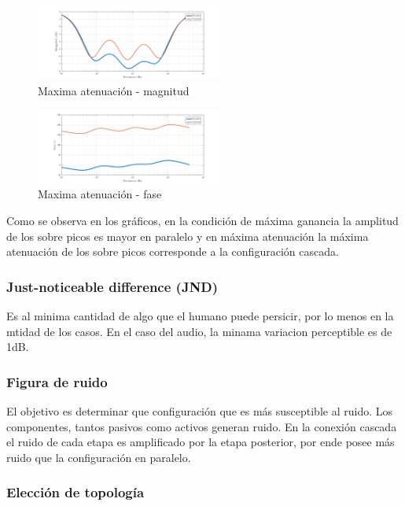 \documentclass[../../tc_tp3_main.tex]{subfiles}
\begin{document}
\begin{figure}[H]
\centering
\includegraphics[width=0.55\textwidth]{imagenes/parCasSimMin_m.png}
\caption{Maxima atenuación - magnitud} 
\end{figure}

\begin{figure}[H]
\centering
\includegraphics[width=0.55\textwidth]{imagenes/parCasSimMin_f.png}
\caption{Maxima atenuación - fase} 
\end{figure}

Como se observa en los gráficos, en la condición de máxima ganancia la amplitud de los sobre picos es mayor en paralelo y en máxima atenuación la máxima atenuación de los sobre picos corresponde a la configuración cascada.


\subsubsection{Just-noticeable difference (JND)}
Es al minima cantidad de algo que el humano puede persicir, por lo menos en la mtidad de los casos. En el caso del audio, la minama variacion perceptible es de 1dB.
\subsubsection{Figura de ruido}
El objetivo es determinar que configuración que es más susceptible al ruido. Los componentes, tantos pasivos como activos generan ruido. En  la conexión cascada el ruido de cada etapa es amplificado por la etapa posterior, por ende posee más ruido que la configuración en paralelo.

\subsubsection{Elección de topología}
\end{document}
